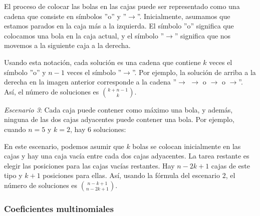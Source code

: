 El proceso de colocar las bolas en las cajas
puede ser representado como una cadena
que consiste en símbolos
''o'' y ''$\rightarrow$''.
Inicialmente, asumamos que estamos parados en la caja más a la izquierda.
El símbolo ''o'' significa que colocamos una bola
en la caja actual, y el símbolo
''$\rightarrow$'' significa que nos movemos a
la siguiente caja a la derecha.

Usando esta notación, cada solución es una cadena
que contiene $k$ veces el símbolo ''o'' y
$n-1$ veces el símbolo ''$\rightarrow$''.
Por ejemplo, la solución de arriba a la derecha
en la imagen anterior corresponde a la cadena
''$\rightarrow$ $\rightarrow$ o $\rightarrow$ o $\rightarrow$''.
Así, el número de soluciones es
${k+n-1 \choose k}$.

\textit{Escenario 3}: Cada caja puede contener como máximo una bola,
y además, ninguna de las dos cajas adyacentes puede contener una bola.
Por ejemplo, cuando $n=5$ y $k=2$,
hay 6 soluciones:


\begin{center}
\end{center}

En este escenario, podemos asumir que
$k$ bolas se colocan inicialmente en las cajas
y hay una caja vacía entre cada
dos cajas adyacentes.
La tarea restante es elegir
las posiciones para las cajas vacías restantes.
Hay $n-2k+1$ cajas de este tipo y
$k+1$ posiciones para ellas.
Así, usando la fórmula del escenario 2,
el número de soluciones es
${n-k+1 \choose n-2k+1}$.

\subsubsection{Coeficientes multinomiales}

